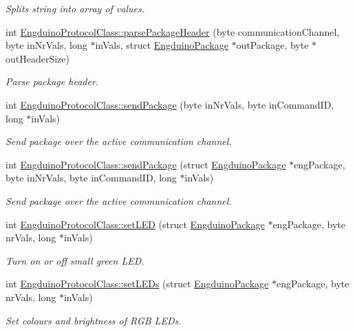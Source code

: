 \begin{DoxyCompactItemize}
\begin{DoxyCompactList}\small\item\em Splits string into array of values. \end{DoxyCompactList}\item 
int \hyperlink{group___engduino_protocol_ga0572419c0b4aaa6f8f0849271787f2b4}{Engduino\+Protocol\+Class\+::parse\+Package\+Header} (byte communication\+Channel, byte in\+Nr\+Vals, long $\ast$in\+Vals, struct \hyperlink{struct_engduino_package}{Engduino\+Package} $\ast$out\+Package, byte $\ast$out\+Header\+Size)
\begin{DoxyCompactList}\small\item\em Parse package header. \end{DoxyCompactList}\item 
int \hyperlink{group___engduino_protocol_gadddb537a6ab657e219d4bbd0d33f79ff}{Engduino\+Protocol\+Class\+::send\+Package} (byte in\+Nr\+Vals, byte in\+Command\+I\+D, long $\ast$in\+Vals)
\begin{DoxyCompactList}\small\item\em Send package over the active communication channel. \end{DoxyCompactList}\item 
int \hyperlink{group___engduino_protocol_gaaf4947d0670da27bdab07065b6cc56b6}{Engduino\+Protocol\+Class\+::send\+Package} (struct \hyperlink{struct_engduino_package}{Engduino\+Package} $\ast$eng\+Package, byte in\+Nr\+Vals, byte in\+Command\+I\+D, long $\ast$in\+Vals)
\begin{DoxyCompactList}\small\item\em Send package over the active communication channel. \end{DoxyCompactList}\item 
int \hyperlink{group___engduino_protocol_ga4f6f6185d9345303466934fb97f5e5f3}{Engduino\+Protocol\+Class\+::set\+L\+E\+D} (struct \hyperlink{struct_engduino_package}{Engduino\+Package} $\ast$eng\+Package, byte nr\+Vals, long $\ast$in\+Vals)
\begin{DoxyCompactList}\small\item\em Turn on or off small green L\+E\+D. \end{DoxyCompactList}\item 
int \hyperlink{group___engduino_protocol_ga429539daf1580716935d0f4c9fee60a7}{Engduino\+Protocol\+Class\+::set\+L\+E\+Ds} (struct \hyperlink{struct_engduino_package}{Engduino\+Package} $\ast$eng\+Package, byte nr\+Vals, long $\ast$in\+Vals)
\begin{DoxyCompactList}\small\item\em Set colours and brightness of R\+G\+B L\+E\+Ds. \end{DoxyCompactList}\item 

\end{DoxyCompactItemize}
